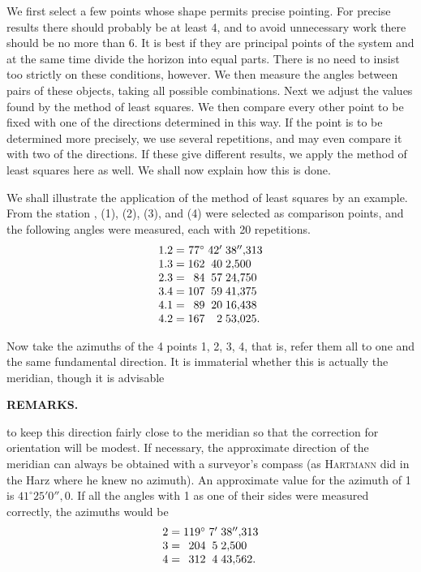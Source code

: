 We first select a few points whose shape permits precise pointing. For precise results there should probably be at least 4, and to avoid unnecessary work there should be no more than 6. It is best if they are principal points of the system and at the same time divide the horizon into equal parts. There is no need to insist too strictly on these conditions, however. We then measure the angles between pairs of these objects, taking all possible combinations. Next we adjust the values found by the method of least squares. We then compare every other point to be fixed with one of the directions determined in this way. If the point is to be determined more precisely, we use several repetitions, and may even compare it with two of the directions. If these give different results, we apply the method of least squares here as well. We shall now explain how this is done.

We shall illustrate the application of the method of least squares by an example. From the station ,  (1),  (2),  (3), and  (4) were selected as comparison points, and the following angles were measured, each with 20 repetitions.
\[
\begin{array}{@{}r@{\;=\;}r@{\;}r@{\;}l@{}}
 1.2&77^\circ&42'&38''{,}313\\
 1.3&162&40&2{,}500\\
 2.3&84&57&24{,}750\\
 3.4&107&59&41{,}375\\
 4.1&89&20&16{,}438\\
 4.2&167&2&53{,}025.
\end{array}
\]

Now take the azimuths of the 4 points 1, 2, 3, 4, that is, refer them all to one and the same fundamental direction. It is immaterial whether this is actually the meridian, though it is advisable
\par\smallskip\noindent{}\par

\par\clearpage
\noindent{}\hfill{\small\textbf{REMARKS.}}\hfill\null\par\medskip

\noindent to keep this direction fairly close to the meridian so that the correction for orientation will be modest. If necessary, the approximate direction of the meridian can always be obtained with a surveyor's compass (as \textsc{Hartmann} did in the Harz where he knew no azimuth). An approximate value for the azimuth of 1 is \(41^\circ25'0''{,}0\). If all the angles with 1 as one of their sides were measured correctly, the azimuths would be
\[
\begin{array}{@{}r@{\;=\;}r@{\;}r@{\;}l@{}}
 2&119^\circ&7'&38''{,}313\\
 3&204&5&2{,}500\\
 4&312&4&43{,}562.
\end{array}
\]

